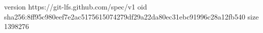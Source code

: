 version https://git-lfs.github.com/spec/v1
oid sha256:8ff95c980eef7e2ac5175615074279df29a22da80ec31ebc91996c28a12fb540
size 1398276

